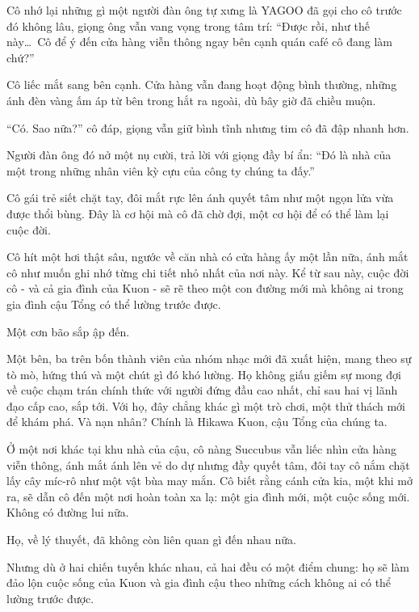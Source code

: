 \documentclass[../main.tex]{subfiles}
\begin{document}
Cô nhớ lại những gì một người đàn ông tự xưng là YAGOO đã gọi cho cô trước đó không lâu, giọng ông vẫn vang vọng trong tâm trí: ``Được rồi, như thế này\dots\ Cô để ý đến cửa hàng viễn thông ngay bên cạnh quán café cô đang làm chứ?''

Cô liếc mắt sang bên cạnh. Cửa hàng vẫn đang hoạt động bình thường, những ánh đèn vàng ấm áp từ bên trong hắt ra ngoài, dù bây giờ đã chiều muộn.

``Có. Sao nữa?'' cô đáp, giọng vẫn giữ bình tĩnh nhưng tim cô đã đập nhanh hơn.

Người đàn ông đó nở một nụ cười, trả lời với giọng đầy bí ẩn: ``Đó là nhà của một trong những nhân viên kỳ cựu của công ty chúng ta đấy.''

Cô gái trẻ siết chặt tay, đôi mắt rực lên ánh quyết tâm như một ngọn lửa vừa được thổi bùng. Đây là cơ hội mà cô đã chờ đợi, một cơ hội để có thể làm lại cuộc đời.

Cô hít một hơi thật sâu, ngước về căn nhà có cửa hàng ấy một lần nữa, ánh mắt cô như muốn ghi nhớ từng chi tiết nhỏ nhất của nơi này. Kể từ sau này, cuộc đời cô - và cả gia đình của Kuon - sẽ rẽ theo một con đường mới mà không ai trong gia đình cậu Tổng có thể lường trước được.

\il

Một cơn bão sắp ập đến.

Một bên, ba trên bốn thành viên của nhóm nhạc mới đã xuất hiện, mang theo sự tò mò, hứng thú và một chút gì đó khó lường. Họ không giấu giếm sự mong đợi về cuộc chạm trán chính thức với người đứng đầu cao nhất, chỉ sau hai vị lãnh đạo cấp cao, sắp tới. Với họ, đây chẳng khác gì một trò chơi, một thử thách mới để khám phá. Và nạn nhân? Chính là Hikawa Kuon, cậu Tổng của chúng ta.

Ở một nơi khác tại khu nhà của cậu, cô nàng Succubus vẫn liếc nhìn cửa hàng viễn thông, ánh mắt ánh lên vẻ do dự nhưng đầy quyết tâm, đôi tay cô nắm chặt lấy cây míc-rô như một vật bùa may mắn. Cô biết rằng cánh cửa kia, một khi mở ra, sẽ dẫn cô đến một nơi hoàn toàn xa lạ: một gia đình mới, một cuộc sống mới. Không có đường lui nữa.

Họ, về lý thuyết, đã không còn liên quan gì đến nhau nữa.

Nhưng dù ở hai chiến tuyến khác nhau, cả hai đều có một điểm chung: họ sẽ làm đảo lộn cuộc sống của Kuon và gia đình cậu theo những cách không ai có thể lường trước được.
\end{document}
